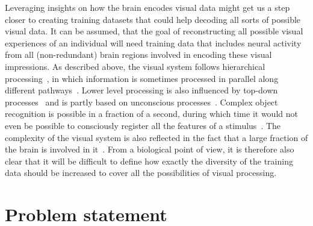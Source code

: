  Leveraging insights on how the brain encodes visual data might get us a step closer to creating training datasets that could help decoding all sorts of possible visual data. It can be assumed, that the goal of reconstructing all possible visual experiences of an individual will need training data that includes neural activity from all (non-redundant) brain regions involved in encoding these visual impressions. As described above, the visual system follows hierarchical processing~\cite{grill-spectorHUMANVISUALCORTEX2004,horikawaGenericDecodingSeen2017,kamitaniDecodingVisualSubjective2005}, in which information is sometimes processed in parallel along different pathways~\cite{ungerleiderWhatWhereHuman1994,kravitzNewNeuralFramework2011}. Lower level processing is also influenced by top-down processes~\cite{barTopdownFacilitationVisual2006,chengReconstructingVisualIllusory2023} and is partly based on unconscious processes~\cite{kravitzNewNeuralFramework2011}. Complex object recognition is possible in a fraction of a second, during which time it would not even be possible to consciously register all the features of a stimulus~\cite{dicarloHowDoesBrain2012}. The complexity of the visual system is also reflected in the fact that a large fraction of the brain is involved in it~\cite{fellemanDistributedHierarchicalProcessing1991a}. From a biological point of view, it is therefore also clear that it will be difficult to define how exactly the diversity of the training data should be increased to cover all the possibilities of visual processing.


\section{Problem statement}

